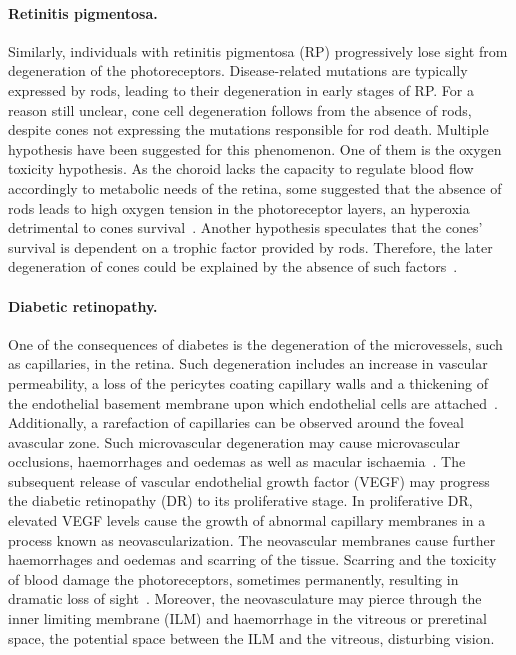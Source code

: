 \documentclass{article}
\begin{document}
\paragraph*{Retinitis pigmentosa.}
Similarly, individuals with retinitis pigmentosa (RP) progressively lose sight from degeneration of the photoreceptors.
Disease-related mutations are typically expressed by rods, leading to their degeneration in early stages of RP.
For a reason still unclear, cone cell degeneration follows from the absence of rods, despite cones not expressing the mutations responsible for rod death.
Multiple hypothesis have been suggested for this phenomenon.
One of them is the oxygen toxicity hypothesis.
As the choroid lacks the capacity to regulate blood flow accordingly to metabolic needs of the retina, some suggested that the absence of rods leads to high oxygen tension in the photoreceptor layers, an hyperoxia detrimental to cones survival~\cite{Roberts_et_al_2018a,Stone_et_al_1999}.
Another hypothesis speculates that the cones' survival is dependent on a trophic factor provided by rods.
Therefore, the later degeneration of cones could be explained by the absence of such factors~\cite{Roberts_2022a}.\\

\paragraph*{Diabetic retinopathy.}
One of the consequences of diabetes is the degeneration of the microvessels, such as capillaries, in the retina.
Such degeneration includes an increase in vascular permeability, a loss of the pericytes coating capillary walls and a thickening of the endothelial basement membrane upon which endothelial cells are attached~\cite{Medina_2016}.
Additionally, a rarefaction of capillaries can be observed around the foveal avascular zone.
Such microvascular degeneration may cause microvascular occlusions, haemorrhages and oedemas as well as macular ischaemia~\cite{Medina_2016}.
The subsequent release of vascular endothelial growth factor (VEGF) may progress the diabetic retinopathy (DR) to its proliferative stage.
In proliferative DR, elevated VEGF levels cause the growth of abnormal capillary membranes in a process known as neovascularization.
The neovascular membranes cause further haemorrhages and oedemas and scarring of the tissue.
Scarring and the toxicity of blood damage the photoreceptors, sometimes permanently, resulting in dramatic loss of sight~\cite{Friedlander_2007,Gupta_2015}.
Moreover, the neovasculature may pierce through the inner limiting membrane (ILM) and haemorrhage in the vitreous or preretinal space, the potential space between the ILM and the vitreous, disturbing vision.\\
\end{document}
